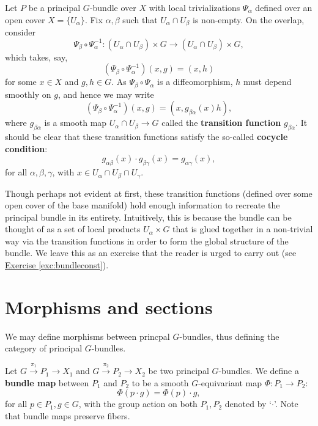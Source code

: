 \begin{defn}
    Let $P$ be a principal $G$-bundle over $X$ with local trivializations $\Psi_\alpha$ defined over an open cover $X=\{U_\alpha\}$.
    Fix $\alpha,\beta$ such that $U_\alpha\cap U_\beta$ is non-empty. 
    On the overlap, consider
    \[\Psi_\beta\circ\Psi_\alpha^{-1}:(U_\alpha\cap U_\beta)\times G\to (U_\alpha\cap U_\beta)\times G,\]
    which takes, say,
    \[(\Psi_\beta\circ\Psi_\alpha^{-1})(x,g)=(x,h)\]
    for some $x\in X$ and $g,h\in G$. As $\Psi_\beta\circ\Psi_\alpha$ is a diffeomorphism, $h$ must depend smoothly on $g$,
    and hence we may write
    \[(\Psi_\beta\circ\Psi_\alpha^{-1})(x,g)=(x,g_{\beta\alpha}(x)h),\]
    where $g_{\beta\alpha}$ is a smooth map $U_\alpha\cap U_\beta\to G$ called the \textbf{transition function} $g_{\beta\alpha}$. 
    It should be clear that these transition functions satisfy the so-called \textbf{cocycle condition}:
    \[g_{\alpha\beta}(x)\cdot g_{\beta\gamma}(x)=g_{\alpha\gamma}(x),\]
    for all $\alpha,\beta,\gamma$, with $x\in U_\alpha\cap U_\beta\cap U_\gamma$.
\end{defn}

Though perhaps not evident at first, these transition functions (defined over some open cover of the base manifold) hold enough
information to recreate the principal bundle in its entirety. Intuitively, this is because the bundle can be thought of
as a set of local products $U_\alpha\times G$ that is glued together in a non-trivial way via the transition functions in order to
form the global structure of the bundle. We leave this as an exercise that the reader is urged to carry out (see \hyperref[exc:bundleconst]{Exercise \ref*{exc:bundleconst}}).

\section{Morphisms and sections}

We may define morphisms between princpal $G$-bundles, thus defining the category of principal $G$-bundles.
\begin{defn}
    Let $G\overset{\pi_1}{\to}P_1\to X_1$ and $G\overset{\pi_2}{\to}P_2\to X_2$ be two principal $G$-bundles. We define a \textbf{bundle
    map} between $P_1$ and $P_2$ to be a smooth $G$-equivariant map $\Phi:P_1\to P_2$:
    \[\Phi(p\cdot g)=\Phi(p)\cdot g,\]
    for all $p\in P_1, g\in G$, with the group action on both $P_1,P_2$ denoted by `$\cdot$'. Note that bundle maps preserve fibers.
\end{defn}

